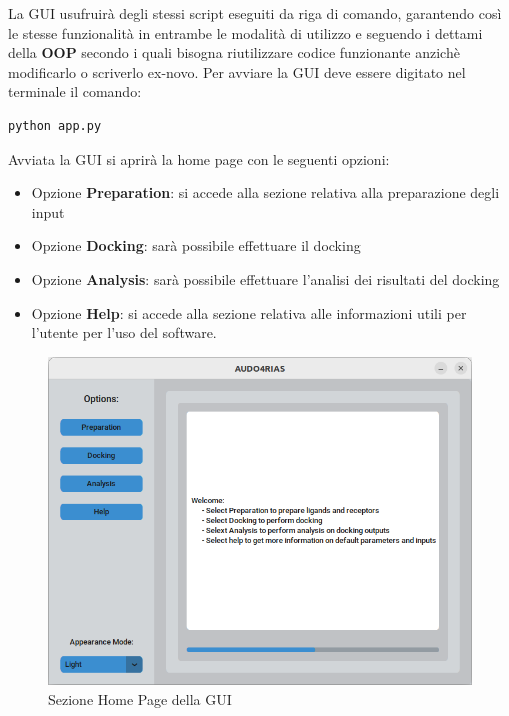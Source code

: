 La GUI usufruirà degli stessi script eseguiti da riga di comando, garantendo così le stesse funzionalità in entrambe le modalità di utilizzo e seguendo i dettami della \textbf{OOP} secondo i quali bisogna riutilizzare codice funzionante anzichè modificarlo o scriverlo ex-novo.\newline
Per avviare la GUI deve essere digitato nel terminale il comando:

\begin{lstlisting}[language=bash, label=lst:code2, caption={Comando per avviare la GUI}]
python app.py    
\end{lstlisting}

Avviata la GUI si aprirà la home page con le seguenti opzioni:

\begin{itemize}
    \item Opzione \textbf{Preparation}: si accede alla sezione relativa alla preparazione degli input
    \item Opzione \textbf{Docking}: sarà possibile effettuare il docking
    \item Opzione \textbf{Analysis}: sarà possibile effettuare l'analisi dei risultati del docking
    \item Opzione \textbf{Help}: si accede alla sezione relativa alle informazioni utili per l'utente per l'uso del software.
\end{itemize}

\begin{figure}[H]
    \centering
    \includegraphics[scale=0.6]{immagini/capitolo3/homePage.png}
    \caption{Sezione Home Page della GUI}
    \label{fig:home page}
\end{figure}

